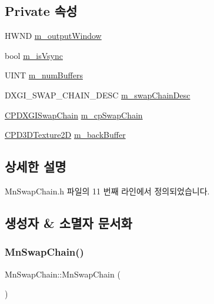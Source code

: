 \subsection*{Private 속성}
\begin{DoxyCompactItemize}
\item 
H\+W\+ND \hyperlink{class_m_n_l_1_1_mn_swap_chain_a746257a748b8e5e81a328e5d6cfb31ec}{m\+\_\+output\+Window}
\item 
bool \hyperlink{class_m_n_l_1_1_mn_swap_chain_a583fac3ec23d49b7e9dd37d63b5e4424}{m\+\_\+is\+Vsync}
\item 
U\+I\+NT \hyperlink{class_m_n_l_1_1_mn_swap_chain_a4e15bac51f179359ea82692a1e22427d}{m\+\_\+num\+Buffers}
\item 
D\+X\+G\+I\+\_\+\+S\+W\+A\+P\+\_\+\+C\+H\+A\+I\+N\+\_\+\+D\+E\+SC \hyperlink{class_m_n_l_1_1_mn_swap_chain_af6fefb453e8ef1cb4516e4d6846cf757}{m\+\_\+swap\+Chain\+Desc}
\item 
\hyperlink{namespace_m_n_l_a5e8905e111c1a9d829a86fc3cc3420ec}{C\+P\+D\+X\+G\+I\+Swap\+Chain} \hyperlink{class_m_n_l_1_1_mn_swap_chain_a909275126e529c571eba97a02785e2fa}{m\+\_\+cp\+Swap\+Chain}
\item 
\hyperlink{namespace_m_n_l_addb538e1cbd1f443e6db5e6312487c51}{C\+P\+D3\+D\+Texture2D} \hyperlink{class_m_n_l_1_1_mn_swap_chain_a04e7f7f6ce776ef60500819832ba0423}{m\+\_\+back\+Buffer}
\end{DoxyCompactItemize}


\subsection{상세한 설명}


Mn\+Swap\+Chain.\+h 파일의 11 번째 라인에서 정의되었습니다.



\subsection{생성자 \& 소멸자 문서화}
\mbox{\label{class_m_n_l_1_1_mn_swap_chain_a98d9d1ab6266a71560c4797071813e24}} 
\subsubsection{\texorpdfstring{Mn\+Swap\+Chain()}{MnSwapChain()}}
{\footnotesize\ttfamily Mn\+Swap\+Chain\+::\+Mn\+Swap\+Chain (\begin{DoxyParamCaption}{ }\end{DoxyParamCaption})}



